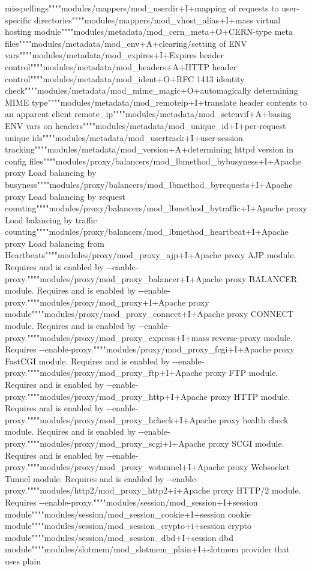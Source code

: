 misspellings""""modules/mappers/mod\+\_\+userdir+\+I+mapping of requests to user-\/specific directories""""modules/mappers/mod\+\_\+vhost\+\_\+alias+\+I+mass virtual hosting module""""modules/metadata/mod\+\_\+cern\+\_\+meta+\+O+\+C\+E\+R\+N-\/type meta files""""modules/metadata/mod\+\_\+env+\+A+clearing/setting of E\+N\+V vars""""modules/metadata/mod\+\_\+expires+\+I+\+Expires header control""""modules/metadata/mod\+\_\+headers+\+A+\+H\+T\+T\+P header control""""modules/metadata/mod\+\_\+ident+\+O+\+R\+F\+C 1413 identity check""""modules/metadata/mod\+\_\+mime\+\_\+magic+\+O+automagically determining M\+I\+M\+E type""""modules/metadata/mod\+\_\+remoteip+\+I+translate header contents to an apparent client remote\+\_\+ip""""modules/metadata/mod\+\_\+setenvif+\+A+basing E\+N\+V vars on headers""""modules/metadata/mod\+\_\+unique\+\_\+id+\+I+per-\/request unique ids""""modules/metadata/mod\+\_\+usertrack+\+I+user-\/session tracking""""modules/metadata/mod\+\_\+version+\+A+determining httpd version in config files""""modules/proxy/balancers/mod\+\_\+lbmethod\+\_\+bybusyness+\+I+\+Apache proxy Load balancing by busyness""""modules/proxy/balancers/mod\+\_\+lbmethod\+\_\+byrequests+\+I+\+Apache proxy Load balancing by request counting""""modules/proxy/balancers/mod\+\_\+lbmethod\+\_\+bytraffic+\+I+\+Apache proxy Load balancing by traffic counting""""modules/proxy/balancers/mod\+\_\+lbmethod\+\_\+heartbeat+\+I+\+Apache proxy Load balancing from Heartbeats""""modules/proxy/mod\+\_\+proxy\+\_\+ajp+\+I+\+Apache proxy A\+J\+P module.  Requires and is enabled by -\/-\/enable-\/proxy.""""modules/proxy/mod\+\_\+proxy\+\_\+balancer+\+I+\+Apache proxy B\+A\+L\+A\+N\+C\+E\+R module.  Requires and is enabled by -\/-\/enable-\/proxy.""""modules/proxy/mod\+\_\+proxy+\+I+\+Apache proxy module""""modules/proxy/mod\+\_\+proxy\+\_\+connect+\+I+\+Apache proxy C\+O\+N\+N\+E\+C\+T module.  Requires and is enabled by -\/-\/enable-\/proxy.""""modules/proxy/mod\+\_\+proxy\+\_\+express+\+I+mass reverse-\/proxy module. Requires -\/-\/enable-\/proxy.""""modules/proxy/mod\+\_\+proxy\+\_\+fcgi+\+I+\+Apache proxy Fast\+C\+G\+I module.  Requires and is enabled by -\/-\/enable-\/proxy.""""modules/proxy/mod\+\_\+proxy\+\_\+ftp+\+I+\+Apache proxy F\+T\+P module.  Requires and is enabled by -\/-\/enable-\/proxy.""""modules/proxy/mod\+\_\+proxy\+\_\+http+\+I+\+Apache proxy H\+T\+T\+P module.  Requires and is enabled by -\/-\/enable-\/proxy.""""modules/proxy/mod\+\_\+proxy\+\_\+hcheck+\+I+\+Apache proxy health check module.  Requires and is enabled by -\/-\/enable-\/proxy.""""modules/proxy/mod\+\_\+proxy\+\_\+scgi+\+I+\+Apache proxy S\+C\+G\+I module.  Requires and is enabled by -\/-\/enable-\/proxy.""""modules/proxy/mod\+\_\+proxy\+\_\+wstunnel+\+I+\+Apache proxy Websocket Tunnel module.  Requires and is enabled by -\/-\/enable-\/proxy.""""modules/http2/mod\+\_\+proxy\+\_\+http2+i+\+Apache proxy H\+T\+T\+P/2 module.  Requires -\/-\/enable-\/proxy.""""modules/session/mod\+\_\+session+\+I+session module""""modules/session/mod\+\_\+session\+\_\+cookie+\+I+session cookie module""""modules/session/mod\+\_\+session\+\_\+crypto+i+session crypto module""""modules/session/mod\+\_\+session\+\_\+dbd+\+I+session dbd module""""modules/slotmem/mod\+\_\+slotmem\+\_\+plain+\+I+slotmem provider that uses plain 